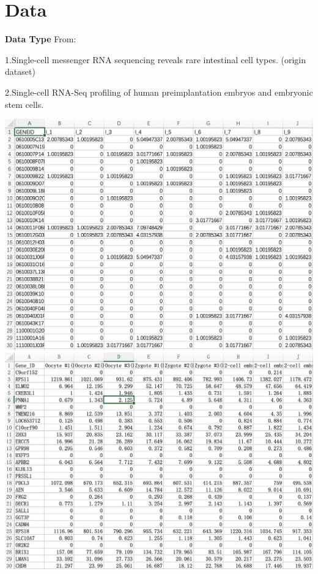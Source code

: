 \documentclass[12pt]{beamer}
\begin{document}
\section{Data}
\begin{frame}{\textbf{Data Type}}
From:

1.Single-cell messenger RNA sequencing reveals rare intestinal cell types. (origin dataset)

2.Single-cell RNA-Seq profiling of human preimplantation embryos and embryonic stem cells.

\centering
\includegraphics[scale=0.25]{fig2/data1.png}
\includegraphics[scale=0.25]{fig2/data2.png}

\end{frame}
\end{document}
